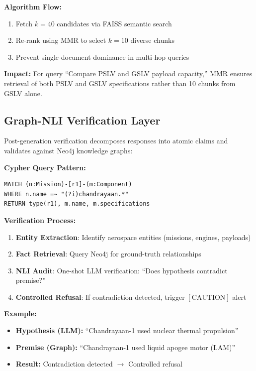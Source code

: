\documentclass[journal,12pt,twocolumn]{IEEEtran}
\begin{document}
\textbf{Algorithm Flow:}
\begin{enumerate}
\item Fetch $k=40$ candidates via FAISS semantic search
\item Re-rank using MMR to select $k=10$ diverse chunks
\item Prevent single-document dominance in multi-hop queries
\end{enumerate}

\textbf{Impact:} For query ``Compare PSLV and GSLV payload capacity,'' MMR ensures retrieval of both PSLV and GSLV specifications rather than 10 chunks from GSLV alone.

\subsection{Graph-NLI Verification Layer}

Post-generation verification decomposes responses into atomic claims and validates against Neo4j knowledge graphs:

\textbf{Cypher Query Pattern:}
\begin{verbatim}
MATCH (n:Mission)-[r1]-(m:Component)
WHERE n.name =~ "(?i)chandrayaan.*"
RETURN type(r1), m.name, m.specifications
\end{verbatim}

\textbf{Verification Process:}
\begin{enumerate}
\item \textbf{Entity Extraction}: Identify aerospace entities (missions, engines, payloads)
\item \textbf{Fact Retrieval}: Query Neo4j for ground-truth relationships
\item \textbf{NLI Audit}: One-shot LLM verification: ``Does hypothesis contradict premise?''
\item \textbf{Controlled Refusal}: If contradiction detected, trigger $[\text{CAUTION}]$ alert
\end{enumerate}

\textbf{Example:}
\begin{itemize}
\item \textbf{Hypothesis (LLM):} ``Chandrayaan-1 used nuclear thermal propulsion''
\item \textbf{Premise (Graph):} ``Chandrayaan-1 used liquid apogee motor (LAM)''
\item \textbf{Result:} Contradiction detected $\rightarrow$ Controlled refusal
\end{itemize}
\end{document}
